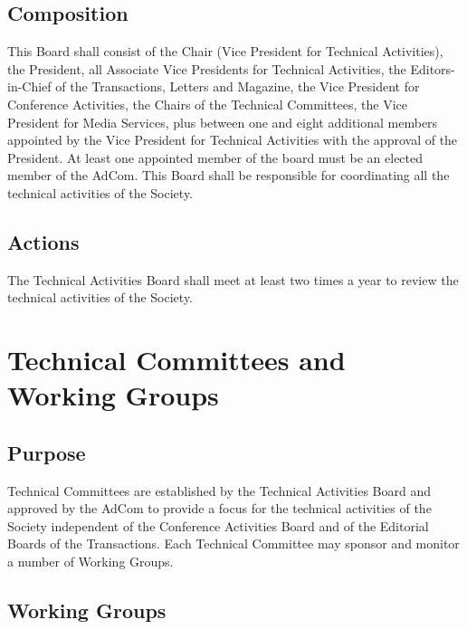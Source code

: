 \documentclass[10pt]{article}
\begin{document}
\subsection{Composition}

This Board shall consist of the Chair (Vice President for Technical Activities), the President, all Associate Vice Presidents for Technical Activities, the Editors-in-Chief of the Transactions, Letters and Magazine, the Vice President for Conference Activities, the Chairs of the Technical Committees, the Vice President for Media Services, plus between one and eight additional members appointed by the Vice President for Technical Activities with the approval of the President. At least one appointed member of the board must be an elected member of the AdCom. This Board shall be responsible for coordinating all the technical activities of the Society.


\subsection{Actions}

The Technical Activities Board shall meet at least two times a year to review the technical activities of the Society. 


\section{Technical Committees and Working Groups}
\label{TCs}



\subsection{Purpose}
Technical Committees are established by the Technical Activities Board and approved by the AdCom to provide a focus for the technical activities of the Society independent of the Conference Activities Board and of the Editorial Boards of the Transactions. Each Technical Committee may sponsor and monitor a number of Working Groups.



\subsection{Working Groups}
\end{document}
